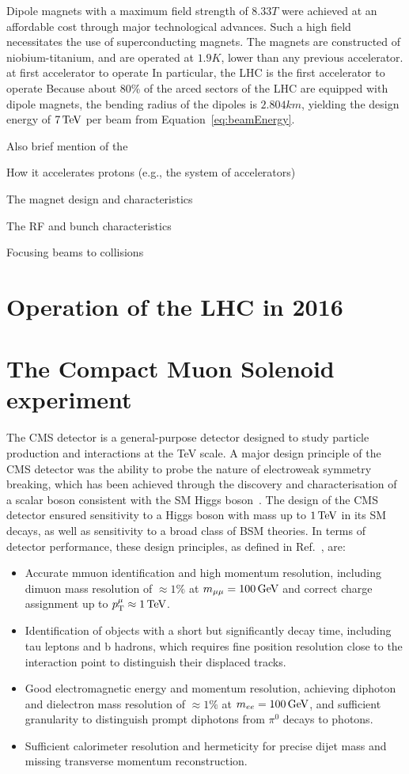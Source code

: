 Dipole magnets with a maximum field strength of $8.33\unit{T}$ were achieved
at an affordable cost through major technological advances. Such a high 
field necessitates the use of superconducting magnets. The magnets 
are constructed of niobium-titanium, and are operated at $1.9\unit{K}$,
lower than any previous accelerator. 
at 
first accelerator to operate 
In particular,
the LHC is the first accelerator to operate 
Because about 80\% of the arced sectors of the LHC are equipped with dipole magnets,
the bending radius of the dipoles is $2.804\unit{km}$, yielding the design energy
of $7\,\text{Te\hspace{-.08em}V}$ per beam from Equation~\ref{eq:beamEnergy}.

Also brief mention of the 

How it accelerates protons (e.g., the system of accelerators)

The magnet design and characteristics 

The RF and bunch characteristics

Focusing beams to collisions


\section{Operation of the LHC in 2016}
\section{The Compact Muon Solenoid experiment}

The CMS detector is a general-purpose detector designed to 
study particle production and interactions at the TeV scale.
A major design principle of the CMS detector was the ability to 
probe the nature of electroweak symmetry breaking, which has been
achieved through the discovery and characterisation of a scalar boson
consistent with the SM Higgs boson~\cite{}. The design of the CMS detector
ensured sensitivity to a Higgs boson with mass up to
$1\,\text{Te\hspace{-.08em}V}$ in its SM decays, as well as sensitivity to a broad class
of BSM theories. In terms of detector performance, these design principles,
as defined in Ref.~\cite{Chatrchyan:2008aa}, are:

\begin{itemize}
  \item Accurate mmuon identification and high momentum resolution, including
    dimuon mass resolution of $\approx 1\%$ at $m_{\mu\mu} = 100\,\text{Ge\hspace{-.08em}V}$ and correct charge
    assignment up to $p_{\mathrm{T}}^{\mu}\approx 1\,\text{Te\hspace{-.08em}V}$.
  \item Identification of objects with a short but significantly decay time,
    including tau leptons and b hadrons, which requires fine position resolution 
    close to the interaction point to distinguish their displaced tracks.
  \item Good electromagnetic energy and momentum resolution, achieving
    diphoton and dielectron mass resolution of $\approx 1\%$ at $m_{ee} = 100\,\text{Ge\hspace{-.08em}V}$,
    and sufficient granularity to distinguish prompt diphotons from $\pi^{0}$ decays to photons.
  \item Sufficient calorimeter resolution and hermeticity for precise dijet mass
    and missing transverse momentum reconstruction.
\end{itemize}

